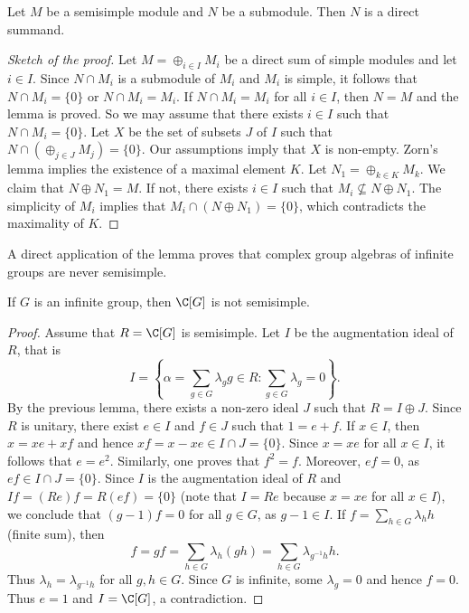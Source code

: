 \begin{lemma}
    Let $M$ be a semisimple module and $N$ be a submodule. 
    Then $N$ is a direct summand.
\end{lemma}

\begin{proof}[Sketch of the proof]
    Let $M=\oplus_{i\in I}M_i$ be a direct sum of simple modules  
    and let $i\in I$. 
    Since $N\cap M_i$ is a submodule of $M_i$ and $M_i$ is simple, it follows
    that $N\cap M_i=\{0\}$ or $N\cap M_i=M_i$. If
    $N\cap M_i=M_i$ for all $i\in I$, then $N=M$ and the lemma is proved. So we may assume
    that there exists $i\in I$ such that $N\cap M_i=\{0\}$. Let $X$ be the set
    of subsets $J$ of $I$ such that $N\cap (\oplus_{j\in J}M_j)=\{0\}$. Our assumptions
    imply that $X$ is non-empty. Zorn's lemma implies the existence of 
    a maximal element $K$. Let $N_1=\oplus_{k\in K}M_k$. We claim that
    $N\oplus N_1=M$. If not, there exists $i\in I$ such that
    $M_i\not\subseteq N\oplus N_1$. The simplicity of $M_i$ implies that
    $M_i\cap (N\oplus N_1)=\{0\}$, which contradicts the maximality of $K$. 
\end{proof}

A direct application of the lemma proves that
complex group algebras of infinite groups are never semisimple. 

\begin{proposition}
    \label{pro:KGsemisimple}
    If $G$ is an infinite group, then $\C[G]$ is not semisimple. 
\end{proposition}

\begin{proof}
	Assume that $R=\C[G]$ is semisimple.  Let $I$ 
	be the augmentation ideal of $R$, that is
	\[
	I=\left\{\alpha=\sum_{g\in G}\lambda_gg\in R:\sum_{g\in G}\lambda_g=0\right\}.
	\]
	By the previous lemma, 
	there exists a non-zero ideal $J$ such that 
	$R=I\oplus J$. Since $R$ is unitary, there exist $e\in I$ and $f\in J$ such that
	$1=e+f$. If
	$x\in I$, then $x=xe+xf$ and hence $xf=x-xe\in I\cap J=\{0\}$. Since 
	$x=xe$ for all $x\in I$, it follows that $e=e^2$. Similarly, one proves
	that $f^2=f$. Moreover, $ef=0$, as $ef\in I\cap J=\{0\}$.  Since $I$ 
	is the augmentation ideal of $R$ and $If=(Re)f=R(ef)=\{0\}$ (note that $I=Re$ because $x=xe$ for all $x\in I$), we conclude that
	$(g-1)f=0$
	for all $g\in G$, as $g-1\in I$. If $f=\sum_{h\in
	G}\lambda_hh$ (finite sum), then  
	\[
	f=gf=\sum_{h\in G}\lambda_h(gh)=\sum_{h\in
	G}\lambda_{g^{-1}h}h.
	\]
	Thus $\lambda_h=\lambda_{g^{-1}h}$ for all $g,h\in G$. Since $G$ 
	is infinite, some $\lambda_g=0$ and hence $f=0$. Thus $e=1$ and $I=\C[G]$, a contradiction. 
\end{proof}

